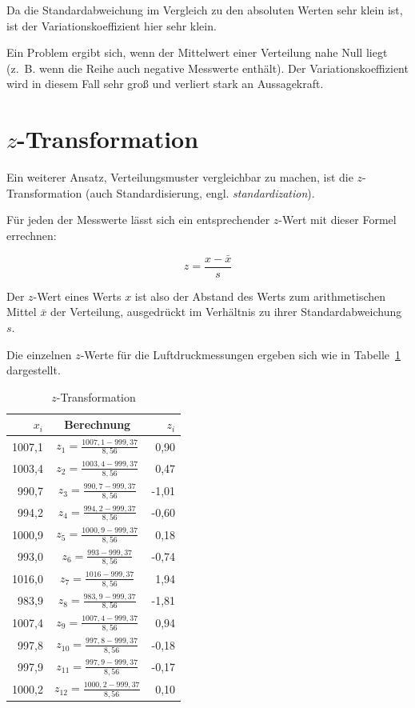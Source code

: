 \documentclass[
  11pt,
  ngerman,
  a4paper,
]{report}
\begin{document}
Da die Standardabweichung im Vergleich zu den absoluten Werten sehr klein ist, ist der Variationskoeffizient hier sehr klein.

Ein Problem ergibt sich, wenn der Mittelwert einer Verteilung nahe Null liegt (z.~B. wenn die Reihe auch negative Messwerte enthält). Der Variationskoeffizient wird in diesem Fall sehr groß und verliert stark an Aussagekraft.

\hypertarget{z-transformation}{%
\section{\texorpdfstring{\(z\)-Transformation}{z-Transformation}}\label{z-transformation}}

Ein weiterer Ansatz, Verteilungsmuster vergleichbar zu machen, ist die \(z\)-Transformation (auch Standardisierung, engl. \emph{standardization}).

Für jeden der Messwerte lässt sich ein entsprechender \(z\)-Wert mit dieser Formel errechnen:

\[
z=\frac{x-\bar{x}}{s}
\label{eq:z}
\]

Der \(z\)-Wert eines Werts \(x\) ist also der Abstand des Werts zum arithmetischen Mittel \(\bar{x}\) der Verteilung, ausgedrückt im Verhältnis zu ihrer Standardabweichung \(s\).

Die einzelnen \(z\)-Werte für die Luftdruckmessungen ergeben sich wie in Tabelle~\ref{tab:trans} dargestellt.

\begin{table}

\caption{\label{tab:trans}$z$-Transformation}
\centering
\begin{tabular}[t]{rcr}
\toprule
$x_i$ & Berechnung & $z_i$\\
\midrule
1007,1 & $z_{1}=\frac{1007,1-999,37}{8,56}$\medskip & 0,90\\
1003,4 & $z_{2}=\frac{1003,4-999,37}{8,56}$\medskip & 0,47\\
990,7 & $z_{3}=\frac{990,7-999,37}{8,56}$\medskip & -1,01\\
994,2 & $z_{4}=\frac{994,2-999,37}{8,56}$\medskip & -0,60\\
1000,9 & $z_{5}=\frac{1000,9-999,37}{8,56}$\medskip & 0,18\\
993,0 & $z_{6}=\frac{993-999,37}{8,56}$\medskip & -0,74\\
1016,0 & $z_{7}=\frac{1016-999,37}{8,56}$\medskip & 1,94\\
983,9 & $z_{8}=\frac{983,9-999,37}{8,56}$\medskip & -1,81\\
1007,4 & $z_{9}=\frac{1007,4-999,37}{8,56}$\medskip & 0,94\\
997,8 & $z_{10}=\frac{997,8-999,37}{8,56}$\medskip & -0,18\\
997,9 & $z_{11}=\frac{997,9-999,37}{8,56}$\medskip & -0,17\\
1000,2 & $z_{12}=\frac{1000,2-999,37}{8,56}$\medskip & 0,10\\
\bottomrule
\end{tabular}
\end{table}
\end{document}
